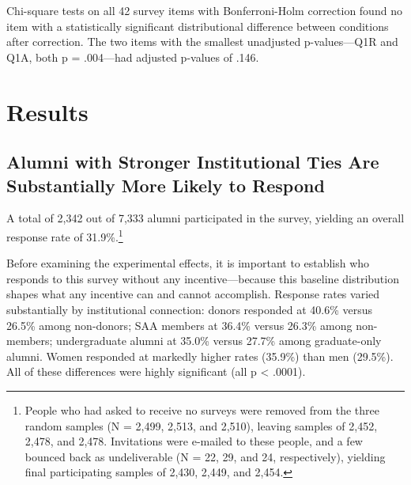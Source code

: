 \documentclass[12pt]{article}
\begin{document}
Chi-square tests on all 42 survey items with Bonferroni-Holm correction found no item with a statistically significant distributional difference between conditions after correction. The two items with the smallest unadjusted p-values---Q1R and Q1A, both p = .004---had adjusted p-values of .146.

\begin{table}[H]
    \caption{Chi-square tests for response distribution differences between conditions. Top 10 items by unadjusted $p$-value shown. None remained significant after Bonferroni-Holm correction.}
    \label{tab:response_distributions}
    \centering\small
    \begin{minipage}{0.65\textwidth}
        
    \end{minipage}
\end{table}




\section{Results}

\subsection{Alumni with Stronger Institutional Ties Are Substantially More Likely to Respond}

A total of 2,342 out of 7,333 alumni participated in the survey, yielding an overall response rate of 31.9\%.\footnote{People who had asked to receive no surveys were removed from the three random samples (N = 2,499, 2,513, and 2,510), leaving samples of 2,452, 2,478, and 2,478. Invitations were e-mailed to these people, and a few bounced back as undeliverable (N = 22, 29, and 24, respectively), yielding final participating samples of 2,430, 2,449, and 2,454.}

Before examining the experimental effects, it is important to establish who responds to this survey without any incentive---because this baseline distribution shapes what any incentive can and cannot accomplish. Response rates varied substantially by institutional connection: donors responded at 40.6\% versus 26.5\% among non-donors; SAA members at 36.4\% versus 26.3\% among non-members; undergraduate alumni at 35.0\% versus 27.7\% among graduate-only alumni. Women responded at markedly higher rates (35.9\%) than men (29.5\%). All of these differences were highly significant (all p < .0001).
\end{document}
